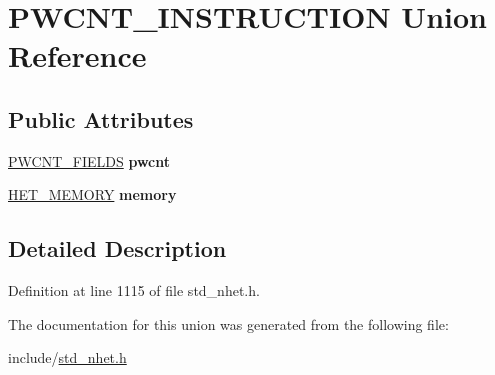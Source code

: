 \hypertarget{unionPWCNT__INSTRUCTION}{}\section{P\+W\+C\+N\+T\+\_\+\+I\+N\+S\+T\+R\+U\+C\+T\+I\+ON Union Reference}
\label{unionPWCNT__INSTRUCTION}
\subsection*{Public Attributes}
\begin{DoxyCompactItemize}
\item 
\mbox{\label{unionPWCNT__INSTRUCTION_a38bec71f77c8f6a0e643543f1e75f238}} 
\mbox{\hyperlink{structpwcnt__format}{P\+W\+C\+N\+T\+\_\+\+F\+I\+E\+L\+DS}} {\bfseries pwcnt}
\item 
\mbox{\label{unionPWCNT__INSTRUCTION_ad752151e040a50ac1f3f3d0f44521c13}} 
\mbox{\hyperlink{structmemory__format}{H\+E\+T\+\_\+\+M\+E\+M\+O\+RY}} {\bfseries memory}
\end{DoxyCompactItemize}


\subsection{Detailed Description}


Definition at line 1115 of file std\+\_\+nhet.\+h.



The documentation for this union was generated from the following file\+:\begin{DoxyCompactItemize}
\item 
include/\mbox{\hyperlink{std__nhet_8h}{std\+\_\+nhet.\+h}}\end{DoxyCompactItemize}
